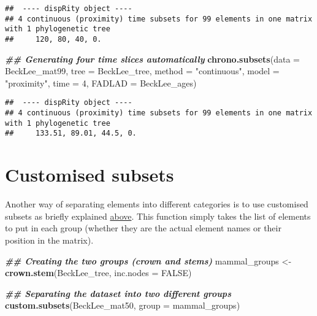 \documentclass[
]{book}
\newenvironment{Shaded}{\begin{snugshade}}{\end{snugshade}}
\newcommand{\AttributeTok}[1]{\textcolor[rgb]{0.13,0.29,0.53}{#1}}
\newcommand{\ConstantTok}[1]{\textcolor[rgb]{0.56,0.35,0.01}{#1}}
\newcommand{\DecValTok}[1]{\textcolor[rgb]{0.00,0.00,0.81}{#1}}
\newcommand{\DocumentationTok}[1]{\textcolor[rgb]{0.56,0.35,0.01}{\textbf{\textit{#1}}}}
\newcommand{\FunctionTok}[1]{\textcolor[rgb]{0.13,0.29,0.53}{\textbf{#1}}}
\newcommand{\NormalTok}[1]{#1}
\newcommand{\OtherTok}[1]{\textcolor[rgb]{0.56,0.35,0.01}{#1}}
\newcommand{\StringTok}[1]{\textcolor[rgb]{0.31,0.60,0.02}{#1}}
\begin{document}
\begin{verbatim}
##  ---- dispRity object ---- 
## 4 continuous (proximity) time subsets for 99 elements in one matrix with 1 phylogenetic tree
##     120, 80, 40, 0.
\end{verbatim}

\begin{Shaded}
\begin{Highlighting}[]
\DocumentationTok{\#\# Generating four time slices automatically}
\FunctionTok{chrono.subsets}\NormalTok{(}\AttributeTok{data =}\NormalTok{ BeckLee\_mat99, }\AttributeTok{tree =}\NormalTok{ BeckLee\_tree,}
               \AttributeTok{method =} \StringTok{"continuous"}\NormalTok{, }\AttributeTok{model =} \StringTok{"proximity"}\NormalTok{,}
               \AttributeTok{time =} \DecValTok{4}\NormalTok{, }\AttributeTok{FADLAD =}\NormalTok{ BeckLee\_ages)}
\end{Highlighting}
\end{Shaded}

\begin{verbatim}
##  ---- dispRity object ---- 
## 4 continuous (proximity) time subsets for 99 elements in one matrix with 1 phylogenetic tree
##     133.51, 89.01, 44.5, 0.
\end{verbatim}

\hypertarget{custom-subsets}{%
\section{Customised subsets}\label{custom-subsets}}

Another way of separating elements into different categories is to use customised subsets as briefly explained \protect\hyperlink{disparity-among-groups}{above}.
This function simply takes the list of elements to put in each group (whether they are the actual element names or their position in the matrix).

\begin{Shaded}
\begin{Highlighting}[]
\DocumentationTok{\#\# Creating the two groups (crown and stems)}
\NormalTok{mammal\_groups }\OtherTok{\textless{}{-}} \FunctionTok{crown.stem}\NormalTok{(BeckLee\_tree, }\AttributeTok{inc.nodes =} \ConstantTok{FALSE}\NormalTok{)}

\DocumentationTok{\#\# Separating the dataset into two different groups}
\FunctionTok{custom.subsets}\NormalTok{(BeckLee\_mat50, }\AttributeTok{group =}\NormalTok{ mammal\_groups)}
\end{Highlighting}
\end{Shaded}
\end{document}
